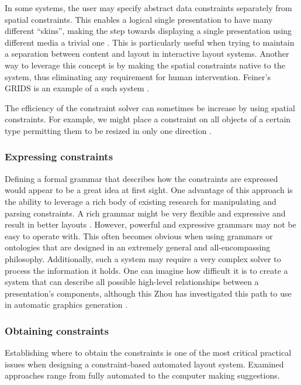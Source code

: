       In some systems, the user may specify abstract data constraints
      separately from spatial constraints. This enables a logical single
      presentation to have many different ``skins'', making the step towards
      displaying a single presentation using different media a trivial one
      \citep{weitzman-2}. This is particularly useful when trying to maintain a
      separation between content and layout in interactive layout systems.
      Another way to leverage this concept is by making the spatial constraints
      native to the system, thus eliminating any requirement for human
      intervention. Feiner’s GRIDS is an example of a such system
      \citep{feiner-1}.

      The efficiency of the constraint solver can sometimes be increase by
      using spatial constraints. For example, we might place a constraint on
      all objects of a certain type permitting them to be resized in only one
      direction \citep{linton-1}.
     
    \subsubsection{Expressing constraints}

     Defining a formal grammar that describes how the constraints are expressed
     would appear to be a great idea at first sight. One advantage of this
     approach is the ability to leverage a rich body of existing research for
     manipulating and parsing constraints. A rich grammar might be very
     flexible and expressive and result in better layouts \citep{weitzman-1}.
     However, powerful and expressive grammars may not be easy to operate with.
     This often becomes obvious when using grammars or ontologies that are
     designed in an extremely general and all-encompassing philosophy.
     Additionally, such a system may require a very complex solver to process
     the information it holds. One can imagine how difficult it is to create a
     system that can describe all possible high-level relationships between a
     presentation's components, although this Zhou has investigated this path
     to use in automatic graphics generation \citep{zhou-1}.

    \subsubsection{Obtaining constraints}

     Establishing where to obtain the constraints is one of the most critical
     practical issues when designing a constraint-based automated layout
     system. Examined approaches range from fully automated to the computer
     making suggestions.


